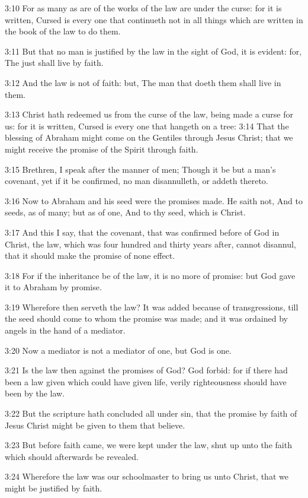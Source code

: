 3:10 For as many as are of the works of the law are under the curse: for it is written, Cursed is every one that continueth not in all things which are written in the book of the law to do them.

3:11 But that no man is justified by the law in the sight of God, it is evident: for, The just shall live by faith.

3:12 And the law is not of faith: but, The man that doeth them shall live in them.

3:13 Christ hath redeemed us from the curse of the law, being made a curse for us: for it is written, Cursed is every one that hangeth on a tree: 3:14 That the blessing of Abraham might come on the Gentiles through Jesus Christ; that we might receive the promise of the Spirit through faith.

3:15 Brethren, I speak after the manner of men; Though it be but a man's covenant, yet if it be confirmed, no man disannulleth, or addeth thereto.

3:16 Now to Abraham and his seed were the promises made. He saith not, And to seeds, as of many; but as of one, And to thy seed, which is Christ.

3:17 And this I say, that the covenant, that was confirmed before of God in Christ, the law, which was four hundred and thirty years after, cannot disannul, that it should make the promise of none effect.

3:18 For if the inheritance be of the law, it is no more of promise: but God gave it to Abraham by promise.

3:19 Wherefore then serveth the law? It was added because of transgressions, till the seed should come to whom the promise was made; and it was ordained by angels in the hand of a mediator.

3:20 Now a mediator is not a mediator of one, but God is one.

3:21 Is the law then against the promises of God? God forbid: for if there had been a law given which could have given life, verily righteousness should have been by the law.

3:22 But the scripture hath concluded all under sin, that the promise by faith of Jesus Christ might be given to them that believe.

3:23 But before faith came, we were kept under the law, shut up unto the faith which should afterwards be revealed.

3:24 Wherefore the law was our schoolmaster to bring us unto Christ, that we might be justified by faith.

